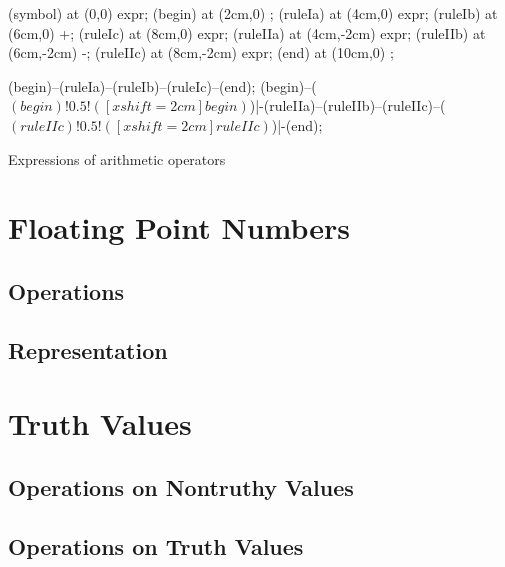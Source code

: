 \begin{syntaxfloat}
  \begin{syntax}
    \node[nonterminal] (symbol)  at (0,0) {expr};
    \node[empty]       (begin)   at (2cm,0) {};
    \node[nonterminal] (ruleIa)  at (4cm,0) {expr};
    \node[terminal]    (ruleIb)  at (6cm,0) {+};
    \node[nonterminal] (ruleIc)  at (8cm,0) {expr};
    \node[nonterminal] (ruleIIa) at (4cm,-2cm) {expr};
    \node[terminal]    (ruleIIb) at (6cm,-2cm) {-};
    \node[nonterminal] (ruleIIc) at (8cm,-2cm) {expr};
    \node[empty]       (end)     at (10cm,0) {};
    
    \draw[path] (begin)--(ruleIa)--(ruleIb)--(ruleIc)--(end);
    \draw[path] (begin)--($(begin)!0.5!([xshift=2cm]begin)$)|-(ruleIIa)--(ruleIIb)--(ruleIIc)--($(ruleIIc)!0.5!([xshift=2cm]ruleIIc)$)|-(end);
  \end{syntax}
  \caption{Expressions of arithmetic operators}
\end{syntaxfloat}





\section{Floating Point Numbers}
\label{primitives:float}

\subsection{Operations}
\subsection{Representation}
\csharpsubsection{\csharp}

\section{Truth Values}


\subsection{Operations on Nontruthy Values}
\subsection{Operations on Truth Values}

